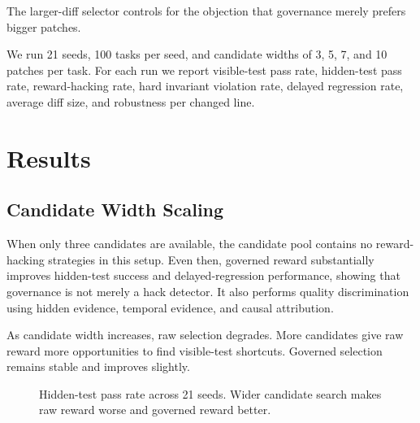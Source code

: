 \documentclass[11pt]{article}
\begin{document}
The larger-diff selector controls for the objection that governance merely prefers bigger patches.

We run 21 seeds, 100 tasks per seed, and candidate widths of 3, 5, 7, and 10 patches per task. For each run we report visible-test pass rate, hidden-test pass rate, reward-hacking rate, hard invariant violation rate, delayed regression rate, average diff size, and robustness per changed line.

\section{Results}

\subsection{Candidate Width Scaling}

When only three candidates are available, the candidate pool contains no reward-hacking strategies in this setup. Even then, governed reward substantially improves hidden-test success and delayed-regression performance, showing that governance is not merely a hack detector. It also performs quality discrimination using hidden evidence, temporal evidence, and causal attribution.

As candidate width increases, raw selection degrades. More candidates give raw reward more opportunities to find visible-test shortcuts. Governed selection remains stable and improves slightly.

\begin{figure}[t]
\centering
{}
\caption{Hidden-test pass rate across 21 seeds. Wider candidate search makes raw reward worse and governed reward better.}
\label{fig:hidden-width}
\end{figure}
\end{document}
